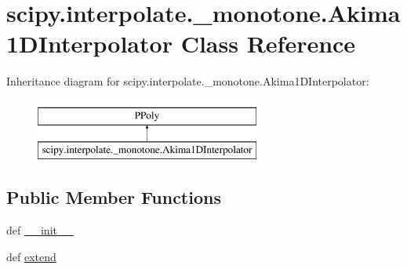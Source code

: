 \hypertarget{classscipy_1_1interpolate_1_1__monotone_1_1Akima1DInterpolator}{}\section{scipy.\+interpolate.\+\_\+monotone.\+Akima1\+D\+Interpolator Class Reference}
\label{classscipy_1_1interpolate_1_1__monotone_1_1Akima1DInterpolator}
Inheritance diagram for scipy.\+interpolate.\+\_\+monotone.\+Akima1\+D\+Interpolator\+:\begin{figure}[H]
\begin{center}
\leavevmode
\includegraphics[height=2.000000cm]{classscipy_1_1interpolate_1_1__monotone_1_1Akima1DInterpolator}
\end{center}
\end{figure}
\subsection*{Public Member Functions}
\begin{DoxyCompactItemize}
\item 
def \hyperlink{classscipy_1_1interpolate_1_1__monotone_1_1Akima1DInterpolator_a30cf69752b5ad0523183e49d4c26d1b4}{\+\_\+\+\_\+init\+\_\+\+\_\+}
\item 
def \hyperlink{classscipy_1_1interpolate_1_1__monotone_1_1Akima1DInterpolator_aa35b8787d50a0f52f45ed82b44e1d706}{extend}
\end{DoxyCompactItemize}


